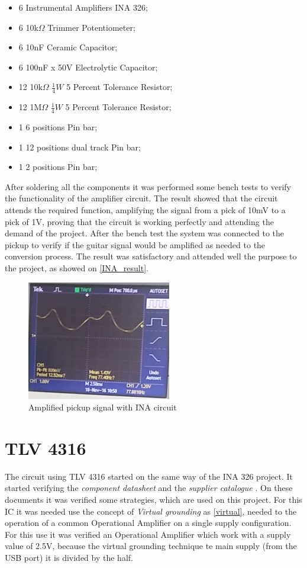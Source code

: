 \begin{itemize}
\item 6 Instrumental Amplifiers INA 326;
\item 6 10k$\Omega$ Trimmer Potentiometer;
\item 6 10nF Ceramic Capacitor;
\item 6 100nF x 50V Electrolytic Capacitor;
\item 12 10k$\Omega$ $\frac{1}{4}W$ 5 Percent Tolerance Resistor;
\item 12 1M$\Omega$ $\frac{1}{4}W$ 5 Percent Tolerance Resistor;
\item 1 6 positions Pin bar;
\item 1 12 positions dual track Pin bar;
\item 1 2 positions Pin bar;
\end{itemize}

After soldering all the components it was performed some bench tests to
verify the functionality of the amplifier circuit. The result showed that the
circuit attends the required function, amplifying the signal from a pick of 10mV
to a pick of 1V, proving that the circuit is working perfectly and attending the
demand of the project. After the bench test the system was connected to the pickup
to verify if the guitar signal would be amplified as needed to the conversion process.
The result was satisfactory and attended well the purpose to the project, as showed on \autoref{INA_result}.

\begin{figure}[!htpb]
\centering
\caption{Amplified pickup signal with INA circuit}
\label{INA_result}
\includegraphics[scale=1]{images/INA_result}
\end{figure}

\section{TLV 4316}
\label{TLV_Circuit}
The circuit using TLV 4316 started on the same way of the INA 326 project.
It started verifying the \textit{component datasheet} \cite{TLV4316} and the \textit{supplier catalogue} \cite{OpAmps}.
On these documents it was verified some strategies, which are used on this project. For this IC it was needed use the
concept of \textit{Virtual grounding} \cite{OpAmps} as \autoref{virtual}, needed to the operation of a common Operational Amplifier on a single
supply configuration. For this use it was verified an Operational Amplifier which work with a supply value of 2.5V, because
the virtual grounding technique te main supply (from the USB port) it is divided by the half.\\

